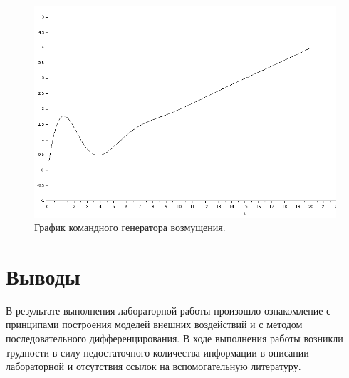 \documentclass[12pt, a4paper] {ncc}
\begin{document}
	\begin{figure}[ht!]
		\includegraphics[scale=0.5]{./plot_v.png}
		\caption{График командного генератора возмущения.}
	\end{figure}
\section{Выводы}

В результате выполнения лабораторной работы произошло ознакомление
с принципами построения моделей внешних воздействий и с методом
последовательного дифференцирования. В ходе выполнения работы
возникли трудности в силу недостаточного количества информации
в описании лабораторной и отсутствия ссылок на вспомогательную
литературу.
\end{document}
